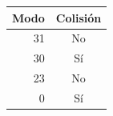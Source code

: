 \begin{tabular}{rc}
\toprule
Modo & Colisión \\
\midrule
31 & No \\
30 & Sí \\
23 & No \\
0 & Sí \\
\bottomrule
\end{tabular}
